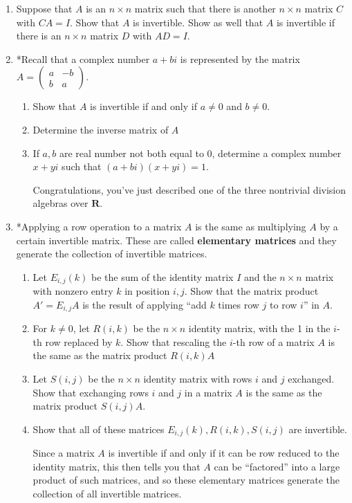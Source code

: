 \documentclass[12pt]{article}
\numberwithin{equation}{subsection}
\numberwithin{figure}{subsection}
\theoremstyle{note}
\begin{document}
\begin{enumerate}[label=\arabic*.]
\item Suppose that $A$ is an $n\times n$ matrix such that there is another $n\times n$ matrix $C$ with $CA=I$. Show that $A$ is invertible. Show as well that $A$ is invertible if there is an $n\times n$ matrix $D$ with $AD=I$. 

\item *Recall that a complex number $a+bi$ is represented by the matrix $A=\begin{pmatrix} a & -b \\ b & a\end{pmatrix}$. 
\begin{enumerate}
	\item Show that $A$ is invertible if and only if $a\neq 0$ and $b\neq 0$. 
	\item Determine the inverse matrix of $A$
	\item If $a,b$ are real number not both equal to $0$, determine a complex number $x+yi$ such that $(a+bi)(x+yi)=1$. 
	
Congratulations, you've just described one of the three nontrivial division algebras over $\mathbf{R}$. 
	
\end{enumerate}
\item *Applying a row operation to a matrix $A$ is the same as multiplying $A$ by a certain invertible matrix. These are called \textbf{elementary matrices} and they generate the collection of invertible matrices. 

\begin{enumerate} 
	\item Let $E_{i,j}(k)$ be the sum of the identity matrix $I$ and the $n\times n$ matrix with nonzero entry $k$ in position $i,j$. Show that the matrix product $A'=E_{i,j}A$ is the result of applying ``add $k$ times row $j$ to row $i$'' in $A$.
	\item For $k\neq 0$, let $R(i,k)$ be the $n\times n$ identity matrix, with the 1 in the $i$-th row replaced by $k$. Show that rescaling the $i$-th row of a matrix $A$ is the same as the matrix product $R(i,k)A$
	\item Let $S(i,j)$ be the $n\times n$ identity matrix with rows $i$ and $j$ exchanged. Show that exchanging rows $i$ and $j$ in a matrix $A$ is the same as the matrix product $S(i,j)A$. 
	\item Show that all of these matrices $E_{i,j}(k), R(i,k), S(i,j)$ are invertible. 
	
	Since a matrix $A$ is invertible if and only if it can be row reduced to the identity matrix, this then tells you that $A$ can be ``factored'' into a large product of such matrices, and so these elementary matrices generate the collection of all invertible matrices. 
\end{enumerate} 
\end{enumerate}
\end{document}
